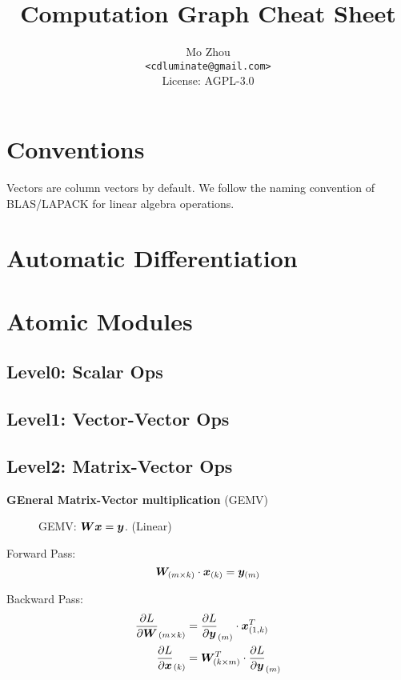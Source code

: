 \documentclass[9pt,twocolumn,times]{article}
\title{Computation Graph Cheat Sheet}
\author{Mo Zhou\\\small\texttt{<cdluminate@gmail.com>}\\
License: AGPL-3.0}
\begin{document}
\maketitle
\tableofcontents

\section{Conventions}

Vectors are column vectors by default.
We follow the naming convention of BLAS/LAPACK for linear algebra operations.

\section{Automatic Differentiation}

\section{Atomic Modules}

\subsection{Level0: Scalar Ops}

\subsection{Level1: Vector-Vector Ops}

\subsection{Level2: Matrix-Vector Ops}

	\textbf{GEneral Matrix-Vector multiplication} (GEMV)

\begin{figure}[h]
	\centering
	\resizebox{0.618\columnwidth}{!}{%
		
	}
	\caption{GEMV: ${\bm{W}} {\bm{x}} = {\bm{y}}$. (Linear)}
\end{figure}

	Forward Pass:
	\begin{equation}
		{\bm{W}}_{(m\times k)} \cdot {\bm{x}}_{(k)} = {\bm{y}}_{(m)}
	\end{equation}

	Backward Pass:
	\begin{align}
		\frac{\partial L}{\partial{\bm{W}}}_{(m\times k)} &=
		\frac{\partial L}{\partial{\bm{y}}}_{(m)} \cdot {\bm{x}}^T_{(1,k)}\\
		\frac{\partial L}{\partial{\bm{x}}}_{(k)} &=
		{\bm{W}}^T_{(k\times m)} \cdot \frac{\partial L}{\partial {\bm{y}}}_{(m)}
	\end{align}
\end{document}
